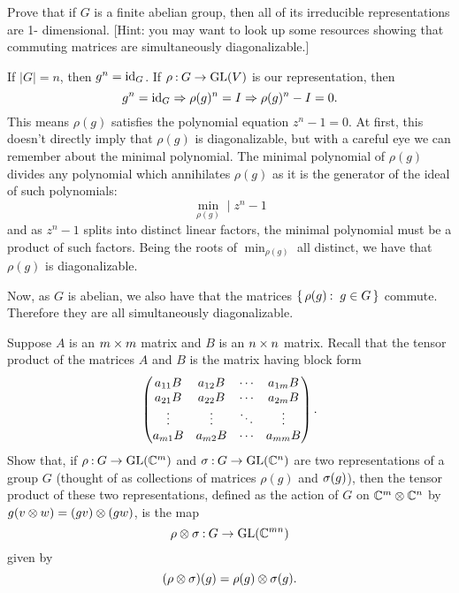 \documentclass[12pt]{memoir}
\begin{document}
\begin{Ej}
    Prove that if $G$ is a ﬁnite abelian group, then all of its irreducible representations are 1-
dimensional. [Hint: you may want to look up some resources showing that commuting matrices are
simultaneously diagonalizable.]
\end{Ej}

\begin{ptcbr}
If $|G|=n$, then $g^n=\operatorname{id}_G$. If $\rho\mathbin{:}G\to\mathrm{GL}(V)$ is our representation, then 
$$g^n=\operatorname{id}_G\Rightarrow\rho(g)^n=I\Rightarrow\rho(g)^n-I=0.$$
This means $\rho(g)$ satisfies the polynomial equation $z^n-1=0$. At first, this doesn't directly imply that $\rho(g)$ is diagonalizable, but with a careful eye we can remember about the minimal polynomial. The minimal polynomial of $\rho(g)$ divides any polynomial which annihilates $\rho(g)$ as it is the generator of the ideal of such polynomials:
$$\min_{\rho(g)}\mid z^n-1$$
and as $z^n-1$ splits into distinct linear factors, the minimal polynomial must be a product of such factors. Being the roots of $\min_{\rho(g)}$ all distinct, we have that $\rho(g)$ is diagonalizable.\par 
Now, as $G$ is abelian, we also have that the matrices $\{\,\rho(g)\mathbin{:}\ g\in G\,\}$ commute. Therefore they are all simultaneously diagonalizable.
\end{ptcbr}

\begin{Ej}
    Suppose $A$ is an $m\times m$ matrix and $B$ is an $n\times n$ matrix. Recall that the tensor product of the matrices $A$ and $B$ is the matrix having block form
    $$\begin{pmatrix} a_{11}B & a_{12}B & \cdots & a_{1m}B\\ a_{21}B & a_{22}B & \cdots & a_{2m}B \\ \vdots & \vdots & \ddots & \vdots \\ a_{m1}B & a_{m2}B & \cdots & a_{mm}B \end{pmatrix}.$$
    Show that, if $\rho\mathbin{:} G\to\mathrm{GL}(\mathbb{C}^m)$ and $\sigma\mathbin{:} G\to\mathrm{GL}(\mathbb{C}^n)$ are two representations of a group $G$ (thought of
as collections of matrices $\rho(g)$ and $\sigma(g)$), then the tensor product of these two representations, deﬁned
as the action of $G$ on $\mathbb{C}^m\otimes\mathbb{C}^n$ by $g(v\otimes w)=(gv)\otimes(gw)$, is the map
$$\rho\otimes\sigma\mathbin{:} G\to\mathrm{GL}(\mathbb{C}^{mn})$$
given by 
$$(\rho\otimes\sigma)(g)=\rho(g)\otimes\sigma(g).$$
\end{Ej}
\end{document}
